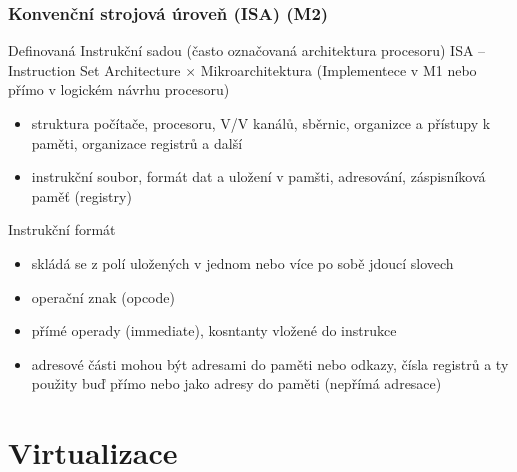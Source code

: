 \documentclass{beamer}
\begin{document}
\begin{frame}
\frametitle{Konvenční strojová úroveň (ISA) (M2)}

Definovaná Instrukční sadou (často označovaná architektura procesoru) ISA -- Instruction Set Architecture $\times$ Mikroarchitektura (Implementece v M1 nebo přímo v logickém návrhu procesoru)

\begin{itemize}
 \item struktura počítače, procesoru, V/V kanálů, sběrnic, organizce a přístupy k paměti, organizace registrů a další
 \item instrukční soubor, formát dat a uložení v pamšti, adresování, záspisníková paměť (registry) 
\end{itemize}

Instrukční formát

\begin{itemize}
 \item skládá se z polí uložených v jednom nebo více po sobě jdoucí slovech
 \item operační znak (opcode)
 \item přímé operady (immediate), kosntanty vložené do instrukce
 \item adresové části mohou být adresami do paměti nebo odkazy, čísla registrů a ty použity buď přímo nebo jako adresy do paměti (nepřímá adresace)
\end{itemize}

\end{frame}

\section{Virtualizace}
\end{document}
